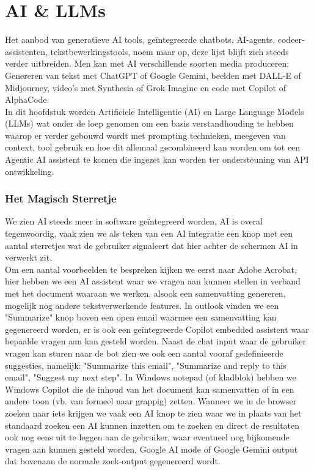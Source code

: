 \section{AI \& LLMs}
\label{sec:aienllms}


Het aanbod van generatieve AI tools, geïntegreerde chatbots, AI-agents, codeer-assistenten, tekstbewerkingstools, noem maar op, deze lijst blijft zich steeds verder uitbreiden. Men kan met AI verschillende soorten media produceren:
Genereren van tekst met ChatGPT of Google Gemini, beelden met DALL-E of Midjourney, video's met Synthesia of Grok Imagine en code met Copilot of AlphaCode. \\

In dit hoofdstuk worden Artificiele Intelligentie (AI) en Large Language Models (LLMs) wat onder de loep genomen om een basis verstandhouding te hebben waarop er verder gebouwd wordt met prompting technieken, meegeven van context, tool gebruik en hoe dit allemaal gecombineerd kan worden om tot een Agentic AI assistent te komen die ingezet kan worden ter ondersteuning van API ontwikkeling.

\subsubsection{Het Magisch Sterretje}
\label{sssec:hetmagischsterretje}
We zien AI steeds meer in software geïntegreerd worden, AI is overal tegenwoordig, vaak zien we als teken van een AI integratie een knop met een aantal sterretjes wat de gebruiker signaleert dat hier achter de schermen AI in verwerkt zit. \\

Om een aantal voorbeelden te bespreken kijken we eerst naar Adobe Acrobat, hier hebben we een AI assistent waar we vragen aan kunnen stellen in verband met het document waaraan we werken, alsook een samenvatting genereren, mogelijk nog andere tekstverwerkende features. In outlook vinden we een "Summarize" knop boven een open email waarmee een samenvatting kan gegenereerd worden, er is ook een geïntegreerde Copilot embedded assistent waar bepaalde vragen aan kan gesteld worden. Naast de chat input waar de gebruiker vragen kan sturen naar de bot zien we ook een aantal vooraf gedefinieerde suggesties, namelijk: "Summarize this email", "Summarize and reply to this email", "Suggest my next step". In Windows notepad (of kladblok) hebben we Windows Copilot die de inhoud van het document kan samenvatten of in een andere toon (vb. van formeel naar grappig) zetten. Wanneer we in de browser zoeken naar iets krijgen we vaak een AI knop te zien waar we in plaats van het standaard zoeken een AI kunnen inzetten om te zoeken en direct de resultaten ook nog eens uit te leggen aan de gebruiker, waar eventueel nog bijkomende vragen aan kunnen gesteld worden, Google AI mode of Google Gemini output dat bovenaan de normale zoek-output gegenereerd wordt. \\

